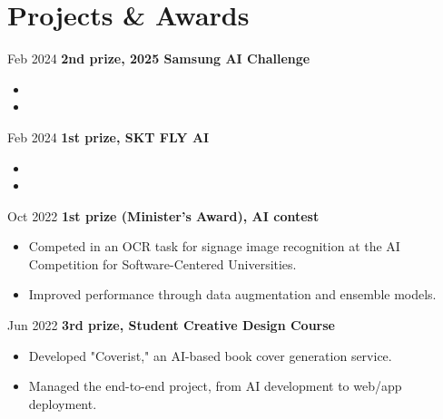 \documentclass[10pt, letterpaper]{article}
\newenvironment{highlights}{
    \begin{itemize}[
        topsep=0.10 cm,
        parsep=0.10 cm,
        partopsep=0pt,
        itemsep=0pt,
        leftmargin=0.4 cm + 10pt
    ]
}{
    \end{itemize}
} %
\newenvironment{twocolentry_project}[2][]{
    \onecolentry
    \def\secondColumn{#2}
    \setcolumnwidth{\fill, 2.0 cm}
    \begin{paracol}{2}
}{
    \switchcolumn \raggedleft \secondColumn
    \end{paracol}
    \endonecolentry
} %
\begin{document}
        \vspace{0.2 cm}

        
    \section{Projects \& Awards}

        \begin{twocolentry_project}{
            Feb 2024
        }
            \textbf{2nd prize, 2025  Samsung AI Challenge}
            \begin{highlights}
                \item
                \item
            \end{highlights}
        \end{twocolentry_project}

        \vspace{0.2 cm}
        
        \begin{twocolentry_project}{
            Feb 2024
        }
            \textbf{1st prize, SKT FLY AI}
            \begin{highlights}
                \item
                \item
            \end{highlights}
        \end{twocolentry_project}
    
        \vspace{0.2 cm}
        

        \begin{twocolentry_project}{
            Oct 2022
        }
            \textbf{1st prize (Minister's Award), AI contest}
            \begin{highlights}
                \item Competed in an OCR task for signage image recognition at the AI Competition for Software-Centered Universities.
                \item Improved performance through data augmentation and ensemble models.
            \end{highlights}
        \end{twocolentry_project}
    
        \vspace{0.2 cm}
    
        \begin{twocolentry_project}{
            Jun 2022
        }
            \textbf{3rd prize, Student Creative Design Course}
            \begin{highlights}
                \item Developed "Coverist," an AI-based book cover generation service.
                \item Managed the end-to-end project, from AI development to web/app deployment.
            \end{highlights}
        \end{twocolentry_project}
\end{document}

